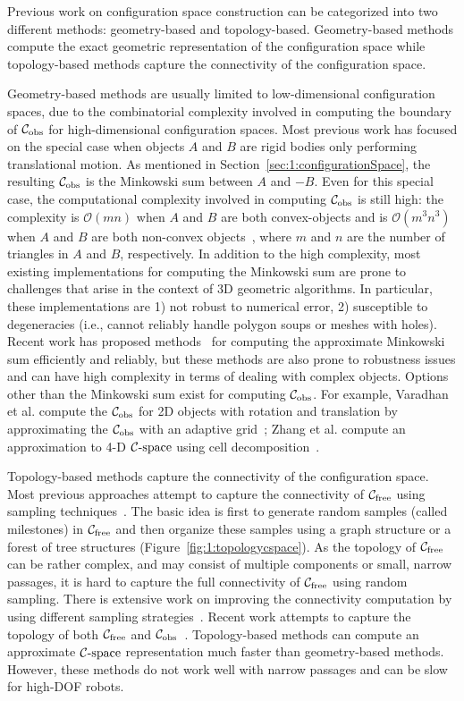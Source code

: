 Previous work on configuration space construction can be categorized into two different methods: geometry-based and topology-based. Geometry-based methods compute the exact geometric representation of the configuration space while topology-based methods capture the connectivity of the configuration space.

Geometry-based methods are usually limited to low-dimensional configuration spaces, due to the combinatorial complexity involved in computing the boundary of $\mathcal C_{\text{obs}}$ for high-dimensional configuration spaces. Most previous work has focused on the special case when objects $A$ and $B$ are rigid bodies only performing translational motion. As mentioned in Section~\ref{sec:1:configurationSpace}, the resulting $\mathcal C_{\text{obs}}$ is the Minkowski sum between $A$ and $-B$. Even for this special case, the computational complexity involved in computing $\mathcal C_{\text{obs}}$ is still high: the complexity is $\mathcal O(mn)$ when $A$ and $B$ are both convex-objects and is $\mathcal O(m^3n^3)$ when $A$ and $B$ are both non-convex objects~\cite{Halperin:2002:RGC}, where $m$ and $n$ are the number of triangles in $A$ and $B$, respectively. In addition to the high complexity, most existing implementations for computing the Minkowski sum are prone to challenges that arise in the context of 3D geometric algorithms. In particular, these implementations are 1) not robust to numerical error, 2) susceptible to degeneracies (i.e., cannot reliably handle polygon soups or meshes with holes). Recent work has proposed methods~\cite{Lien:2008:CMS,Lien:2007:ACD,Lien:2009:ASM} for computing the approximate Minkowski sum efficiently and reliably, but these methods are also prone to robustness issues and can have high complexity in terms of dealing with complex objects. Options other than the Minkowski sum exist for computing  $\mathcal C_{\text{obs}}$. For example, Varadhan et al. compute the $\mathcal C_{\text{obs}}$ for 2D objects with rotation and translation by approximating the $\mathcal C_{\text{obs}}$ with an adaptive grid~\cite{Varadhan:2006:TPA}; Zhang et al. compute an approximation to 4-D $\mathcal C\text{-space}$ using cell decomposition~\cite{Zhang:2007:IROS}.

Topology-based methods capture the connectivity of the configuration space. Most previous approaches attempt to capture the connectivity of $\mathcal C_{\text{free}}$ using sampling techniques~\cite{Kavraki96,Kuffner00}. The basic idea is first to generate random samples (called milestones) in $\mathcal C_{\text{free}}$ and then organize these samples using a graph structure or a forest of tree structures (Figure~\ref{fig:1:topologycspace}). As the topology of $\mathcal C_{\text{free}}$ can be rather complex, and
may consist of multiple components or small, narrow passages, it is hard to capture the full connectivity of $\mathcal C_{\text{free}}$ using random sampling. There is extensive work on improving the connectivity computation by using different sampling strategies~\cite{Amato:1998:OOP,Boor:1999:ICRA,Hsu:1998:FNP,Rodriguez:2006,Zhang:2008:ICRA,Zheng:2005}. Recent work attempts to capture the topology of both $\mathcal C_{\text{free}}$ and $\mathcal C_{\text{obs}}$~\cite{Jory:2011:IROS}. Topology-based methods can compute an approximate $\mathcal C\text{-space}$ representation much faster than geometry-based methods. However, these methods do not work well with narrow passages and can be slow for high-DOF robots.


